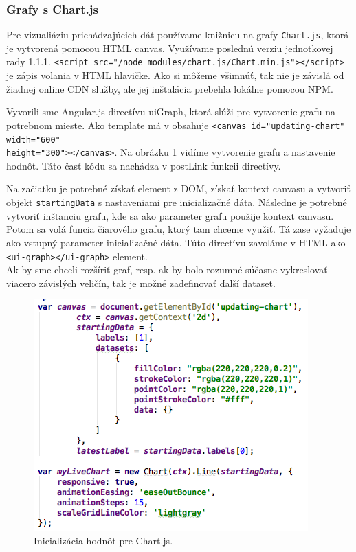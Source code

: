 \subsubsection{Grafy s Chart.js}
Pre vizualiáziu prichádzajúcich dát používame knižnicu na grafy \verb|Chart.js|, ktorá je vytvorená pomocou HTML canvas. Využívame poslednú verziu jednotkovej rady 1.1.1. \verb|<script src="/node_modules/chart.js/Chart.min.js"></script>| je zápis volania v HTML hlavičke. Ako si môžeme všimnúť, tak nie je závislá od žiadnej online CDN služby, ale jej inštalácia prebehla lokálne pomocou NPM.

Vyvorili sme Angular.js directívu uiGraph, ktorá slúži pre vytvorenie grafu na potrebnom mieste. Ako template má v obsahuje \verb|<canvas id="updating-chart" width="600"| \\ \verb|height="300"></canvas>|. Na obrázku \ref{img-angular-chartjs-canvas} vidíme vytvorenie grafu a nastavenie hodnôt. Táto časť kódu sa nachádza v postLink funkcii directívy.

Na začiatku je potrebné získať element z DOM, získať kontext canvasu a vytvoriť objekt \verb|startingData| s nastaveniami pre inicializačné dáta. 
Následne je potrebné vytvoriť inštanciu grafu, kde sa ako parameter grafu použije kontext canvasu. Potom sa volá funcia čiarového grafu, ktorý tam chceme využiť. Tá zase vyžaduje ako vstupný parameter inicializačné dáta. Túto directívu zavoláme v HTML ako \verb|<ui-graph></ui-graph>| element.\\

Ak by sme chceli rozšíriť graf, resp. ak by bolo rozumné súčasne vykreslovať viacero závislých veličín, tak je možné zadefinovať ďalší dataset.

\begin{figure}[H]
  \centering
  \includegraphics[scale=0.7]{img/code/angular-chartjs-code.png}
  \caption{Inicializácia hodnôt pre Chart.js.}
  \label{img-angular-chartjs-canvas}
\end{figure}

